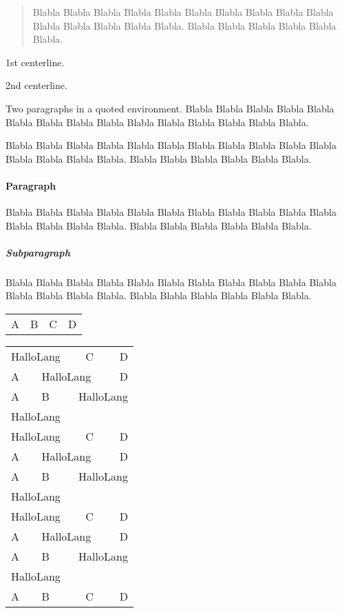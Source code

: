 \documentclass[12pt]{article}
\begin{document}
{\begin{quote}
  Blabla Blabla Blabla Blabla Blabla Blabla Blabla Blabla Blabla
  Blabla Blabla Blabla Blabla Blabla Blabla.  Blabla Blabla Blabla
  Blabla Blabla Blabla.
\end{quote}

\centerline{1st centerline.}
\centerline{2nd centerline.}

\begin{center}
  Two paragraphs in a quoted environment. Blabla Blabla Blabla Blabla
  Blabla Blabla Blabla Blabla Blabla Blabla Blabla Blabla Blabla
  Blabla Blabla.
  
  Blabla Blabla Blabla Blabla Blabla Blabla Blabla Blabla Blabla
  Blabla Blabla Blabla Blabla Blabla Blabla.  Blabla Blabla Blabla
  Blabla Blabla Blabla.
\end{center}

\paragraph{Paragraph}

  Blabla Blabla Blabla Blabla Blabla Blabla Blabla Blabla Blabla
  Blabla Blabla Blabla Blabla Blabla Blabla.  Blabla Blabla Blabla
  Blabla Blabla Blabla.

\subparagraph{Subparagraph}

  Blabla Blabla Blabla Blabla Blabla Blabla Blabla Blabla Blabla
  Blabla Blabla Blabla Blabla Blabla Blabla.  Blabla Blabla Blabla
  Blabla Blabla Blabla.

\begin{tabular}{llcr}
A & B & C & D
\end{tabular}

\begin{tabular}{llcr}\hline
\multicolumn{2}{l}{HalloLang} & C & D     \\
A & \multicolumn{2}{l}{HalloLang} & D     \\
A & B & \multicolumn{2}{l}{HalloLang}     \\
\multicolumn{4}{l}{HalloLang}             \\
%
\multicolumn{2}{l}{HalloLang} & C & D     \\\hline
A & \multicolumn{2}{l}{HalloLang} & D     \\\hline
A & B & \multicolumn{2}{l}{HalloLang}     \\\hline
\multicolumn{4}{l}{HalloLang}             \\\hline
%
\multicolumn{2}{l}{HalloLang} & C & D     \\\hline\hline
A & \multicolumn{2}{l}{HalloLang} & D     \\\hline\hline
A & B & \multicolumn{2}{l}{HalloLang}     \\\hline\hline
\multicolumn{4}{l}{HalloLang}             \\\hline\hline
%
A & B & C & D                             \\\hline\hline
\end{tabular}

}
\end{document}
